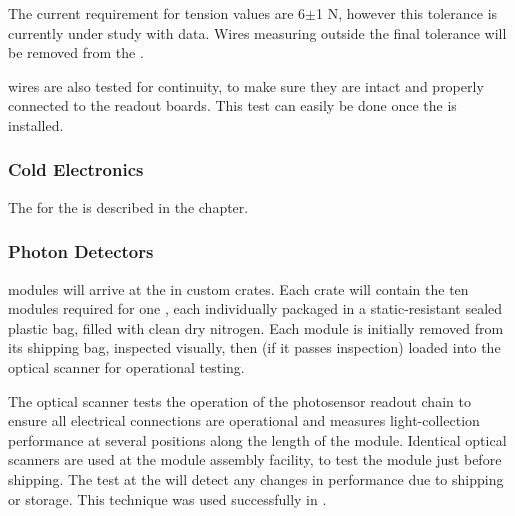 The current requirement for tension values are 6$\pm$1 N, however this tolerance is currently under study with  data. %
Wires measuring outside the final tolerance %
will be removed from the .

 wires are also tested for %
continuity, to make sure they are %
intact and properly connected to the readout boards. This test can easily be done once the  is installed. %

\subsubsection{Cold Electronics}
The  for the  is described in the  chapter.

\subsubsection{Photon Detectors}

 modules will arrive at the  in custom crates.  Each crate will contain the ten modules required for one , each individually packaged in a static-resistant sealed plastic bag, filled with clean dry nitrogen. Each  module is initially removed from its shipping bag, inspected visually, then (if it passes inspection) loaded into the optical scanner for operational testing.


The optical scanner tests the operation of the photosensor readout chain to ensure all electrical connections are operational and measures light-collection performance at several positions along the length of the module.  Identical optical scanners are used at the module assembly facility, to test the module just before shipping. The test at the  will detect any changes in performance due to shipping or storage.  This technique was used successfully in .

